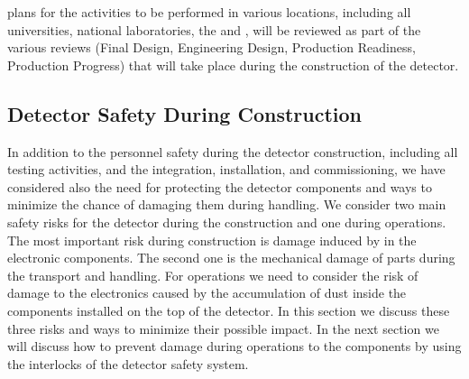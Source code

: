  plans for the activities to be performed in various
locations, including all universities, national laboratories,
the  and \surf, will be  reviewed as part of the 
various reviews (Final Design, Engineering Design, Production 
Readiness, Production Progress) that will take place during the construction of the detector.

\subsection{Detector Safety During Construction}
\label{sec:fdsp-tpcelec-safety-detcon}


In addition to the personnel safety during the detector
construction, including all testing activities, and the
integration, installation, and commissioning, we have 
considered also the need for protecting the detector
components and ways to minimize the chance of damaging
them during handling. We consider two main safety risks 
for the detector during the construction and one during
operations. The most important risk during construction is damage 
induced by  in the 
electronic components. The second one is the mechanical damage of 
parts during the transport and handling. For operations we
need to consider the risk of damage to the electronics 
caused by the accumulation of dust inside the components
installed on the top of the detector. In this section 
we discuss these three risks and ways to minimize their possible 
impact. In the next section we will discuss how to prevent
damage during operations to the  components 
by using the interlocks of the detector safety system.

